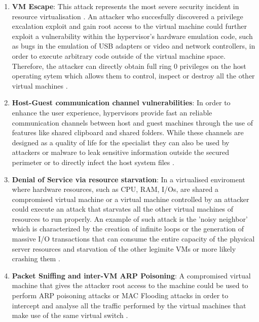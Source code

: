 \begin{enumerate}
    \item \textbf{VM Escape}: This attack represents the most severe security incident in resource virtualisation \cite{vm-attack-vectors,vm-security.pdf}. An attacker who succesfully discovered a privilege excalation exploit and gain root access to the virtual machine could further exploit a vulnerability within the hypervisor's hardware emulation code, such as bugs in the emulation of USB adapters or video and network controllers, in order to execute arbitrary code outside of the virtual machine space. Therefore, the attacker can directly obtain full ring 0 privileges on the host operating sytem which allows them to control, inspect or destroy all the other virtual machines \cite{vm-attack-vectors,vm-security.pdf}. 

    \item \textbf{Host-Guest communication channel vulnerabilities}: In order to enhance the user experience, hypervisors provide fast an reliable communication channels between host and guest machines through the use of features like shared clipboard and shared folders. While these channels are designed as a quality of life for the specialist they can also be used by attackers or malware to leak sensitive information outside the secured perimeter or to directly infect the host system files \cite{vm-security.pdf}.
    
    \item \textbf{Denial of Service via resource starvation}: In a virtualised enviroment where hardware resources, such as CPU, RAM, I/Os, are shared a compromised virtual machine or a virtual machine controlled by an attacker could execute an attack that starvates all the other virtual machines of resources to run properly. An example of such attack is the 'noisy neighbor' which is characterized by the creation of infinite loops or the generation of massive I/O transactions that can consume the entire capacity of the physical server resources and starvation of the other legimite VMs or more likely crashing them \cite{vm-security.pdf}.  

    \item \textbf{Packet Sniffing and inter-VM ARP Poisoning}: A compromised virtual machine that gives the attacker root access to the machine could be used to perform ARP poisoning attacks or MAC Flooding attacks in order to intercept and analyse all the traffic performed by the virtual machines that make use of the same virtual switch \cite{vm-security.pdf,vm-attack-vectors}.


    \end{enumerate}

